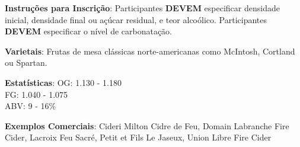\textbf{Instruções para Inscrição}: Participantes \textbf{DEVEM} especificar densidade inicial, densidade final ou açúcar residual, e teor alcoólico. Participantes \textbf{DEVEM} especificar o nível de carbonatação.

\textbf{Varietais}: Frutas de mesa clássicas norte-americanas como McIntosh, Cortland ou Spartan.

\textbf{Estatísticas}: OG: 1.130 - 1.180 \\
\phantom{ } \hspace{16.5mm} FG: 1.040 - 1.075 \\
\phantom{ } \hspace{16.5mm} ABV: 9 - 16\%

\textbf{Exemplos Comerciais}: Cideri Milton Cidre de Feu, Domain Labranche Fire Cider, Lacroix Feu Sacré, Petit et Fils Le Jaseux, Union Libre Fire Cider
